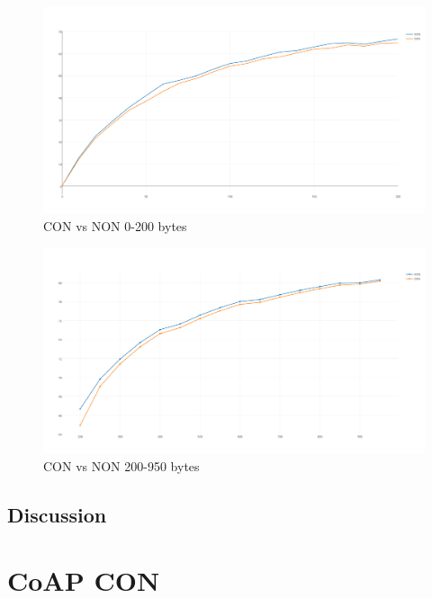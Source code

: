 \begin{figure}[ht]
    \centering
    \includegraphics[scale=0.35]{NONvsCON_0-200.png}    
    \caption{CON vs NON 0-200 bytes}
    \label{fig:CONvsNON0-200}
\end{figure}



\begin{figure}[ht]
    \centering
    \includegraphics[scale=0.35]{NON-CON_200-950GRAPH.png}    
    \caption{CON vs NON 200-950 bytes}
    \label{fig:CONvsNON200-950}
\end{figure}




\subsection{Discussion}




\section{CoAP CON}


